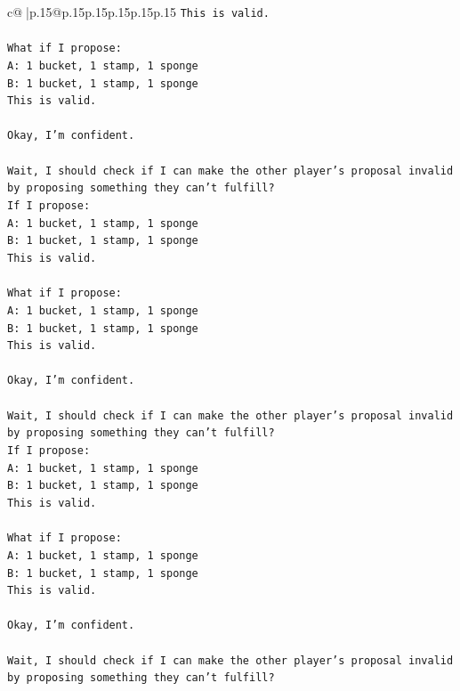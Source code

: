 \documentclass{article}
\begin{document}
{\begin{supertabular}{c@{$\;$}|p{.15\linewidth}@{}p{.15\linewidth}p{.15\linewidth}p{.15\linewidth}p{.15\linewidth}p{.15\linewidth}}
{{{\texttt{This is valid.} \\
\\ 
\texttt{What if I propose:} \\
\texttt{A: 1 bucket, 1 stamp, 1 sponge} \\
\texttt{B: 1 bucket, 1 stamp, 1 sponge} \\
\texttt{This is valid.} \\
\\ 
\texttt{Okay, I'm confident.} \\
\\ 
\texttt{Wait, I should check if I can make the other player's proposal invalid by proposing something they can't fulfill?} \\
\texttt{If I propose:} \\
\texttt{A: 1 bucket, 1 stamp, 1 sponge} \\
\texttt{B: 1 bucket, 1 stamp, 1 sponge} \\
\texttt{This is valid.} \\
\\ 
\texttt{What if I propose:} \\
\texttt{A: 1 bucket, 1 stamp, 1 sponge} \\
\texttt{B: 1 bucket, 1 stamp, 1 sponge} \\
\texttt{This is valid.} \\
\\ 
\texttt{Okay, I'm confident.} \\
\\ 
\texttt{Wait, I should check if I can make the other player's proposal invalid by proposing something they can't fulfill?} \\
\texttt{If I propose:} \\
\texttt{A: 1 bucket, 1 stamp, 1 sponge} \\
\texttt{B: 1 bucket, 1 stamp, 1 sponge} \\
\texttt{This is valid.} \\
\\ 
\texttt{What if I propose:} \\
\texttt{A: 1 bucket, 1 stamp, 1 sponge} \\
\texttt{B: 1 bucket, 1 stamp, 1 sponge} \\
\texttt{This is valid.} \\
\\ 
\texttt{Okay, I'm confident.} \\
\\ 
\texttt{Wait, I should check if I can make the other player's proposal invalid by proposing something they can't fulfill?} \\
}}}
\end{supertabular}}
\end{document}
